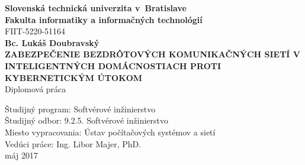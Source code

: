 \documentclass[12pt,a4wide,oneside,openright]{report}
\begin{document}
\titleformat{\chapter}[hang]{\bf\huge}{\thechapter}{2pc}{}
\setcounter{tocdepth}{3}
\begin{titlepage}
	\begin{center}
	\large \textbf{Slovenská technická univerzita v~Bratislave \\
	Fakulta informatiky a informačných technológií} \\
	\vspace{0.8cm}	
	\normalsize FIIT-5220-51164 \\
	\vspace{6cm}
	\Large \textbf{Bc. Lukáš Doubravský} \\
	\vspace{0.5cm}
	\textbf{ZABEZPEČENIE BEZDRÔTOVÝCH KOMUNIKAČNÝCH SIETÍ V INTELIGENTNÝCH DOMÁCNOSTIACH PROTI KYBERNETICKÝM ÚTOKOM} \\
	\vspace{0.5cm}
    Diplomová práca
	\end{center}
	\vspace{4.5cm}	
	\begin{flushleft}
	\begin{onehalfspacing}
		Študijný program: \tabto{4.2cm}Softvérové inžinierstvo \\
		Študijný odbor: \tabto{4.2cm}9.2.5. Softvérové inžinierstvo \\
		Miesto vypracovania: \tabto{4.2cm}Ústav počítačových systémov a sietí  \\
		Vedúci práce: \tabto{4.2cm}Ing. Libor Majer, PhD. \\
		\vspace{0.5cm}
		máj 2017  
	\end{onehalfspacing}	
	\end{flushleft}
\end{titlepage}

\newpage
\thispagestyle{empty}
\mbox{}

\newpage
\thispagestyle{empty}
\vspace*{18cm}
\end{document}
